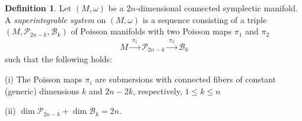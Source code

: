 \documentclass[11pt]{amsart}
\theoremstyle{definition}
\newtheorem{definition}[theorem]{Definition}
\theoremstyle{plain}
\theoremstyle{conclusion}
\begin{document}
\begin{definition} 
\label{def:superge} 
Let $(M,\omega)$ be a $2n$-dimensional connected symplectic manifold. A \textit{superintegrable system} on $(M,\omega)$ is a sequence consisting of a triple $(M,\mathcal{P}_{2n-k},\mathcal{B}_k)$ of Poisson manifolds with two Poisson maps $\pi_1$ and $\pi_2$ \begin{align}
M \xrightarrow{\;\pi_1\;} \mathcal{P}_{2n-k} \xrightarrow{\;\pi_2\;} \mathcal{B}_k \label{eq:sup}
\end{align} such that the following holds:

(i) The Poisson maps  $\pi_i$ are submersions with connected fibers of constant (generic) dimensions $k$ and $2n-2k$, respectively, $1\leq k\leq n$ 


(ii) $\dim \mathcal{P}_{2n-k} +\dim \mathcal{B}_k=2n$. 
\end{definition}
\end{document}
